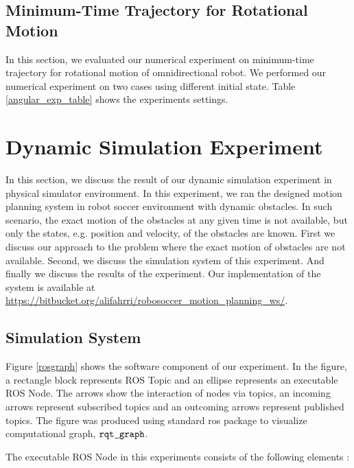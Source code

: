 \documentclass[../thesis.tex]{subfiles}
\begin{document}
\subsection{Minimum-Time Trajectory for Rotational Motion}
In this section, we evaluated our numerical experiment on minimum-time trajectory for rotational motion of omnidirectional robot. We performed our numerical experiment on two cases using different initial state. Table \ref{angular_exp_table} shows the experiments settings.

\section{Dynamic Simulation Experiment}

In this section, we discuss the result of our dynamic simulation experiment in physical simulator environment. In this experiment, we ran the designed motion planning system in robot soccer environment with dynamic obstacles. In such scenario, the exact motion of the obstacles at any given time is not available, but only the states, e.g. position and velocity, of the obstacles are known. First we discuss our approach to the problem where the exact motion of obstacles are not available. Second, we discuss the simulation system of this experiment. And finally we discuss the results of the experiment. Our implementation of the system is available at \url{https://bitbucket.org/alifahrri/robosoccer_motion_planning_ws/}.

\subsection{Simulation System}
Figure \ref{rosgraph} shows the software component of our experiment. In the figure, a rectangle block represents ROS Topic and an ellipse represents an executable ROS Node. The arrows show the interaction of nodes via topics, an incoming arrows represent subscribed topics and an outcoming arrows represent published topics. The figure was produced using standard ros package to visualize computational graph, $\texttt{rqt\_graph}$.

The executable ROS Node in this experiments consists of the following elements :
\end{document}
